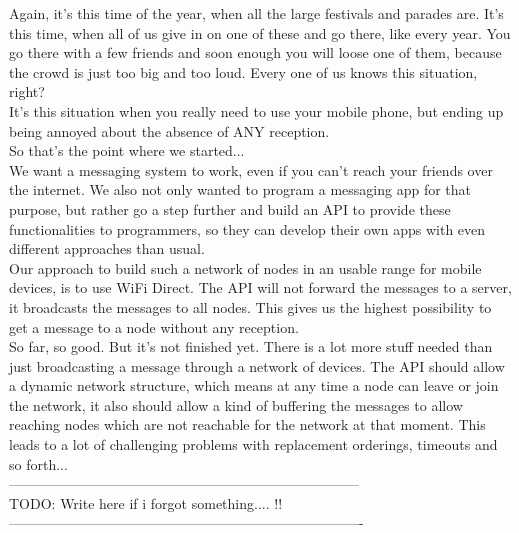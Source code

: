 Again, it's this time of the year, when all the large festivals and parades are. It's this time, when all of us give in on one of these and go there, like every year. 
You go there with a few friends and soon enough you will loose one of them, because the crowd is just too big and too loud. Every one of us knows this situation, right? \\
It's this situation when you really need to use your mobile phone, but ending up being annoyed about the absence of ANY reception. \\
So that's the point where we started... \\

We want a messaging system to work, even if you can't reach your friends over the internet. We also not only wanted to program a messaging app for that purpose, but rather go a step further and build an API to provide these functionalities to programmers, so they can develop their own apps with even diﬀerent approaches than usual. \\

Our approach to build such a network of nodes in an usable range for mobile devices, is to use WiFi Direct. The API will not forward the messages to a server, it broadcasts the messages to all nodes. This gives us the highest possibility to get a message to a node without any reception. \\

So far, so good. But it's not finished yet. There is a lot more stuff needed than just broadcasting a message through a network of devices. The API should allow a dynamic network structure, which means at any time a node can leave or join the network, it also should allow a kind of buffering the messages to allow reaching nodes which are not reachable for the network at that moment. This leads to a lot of challenging problems with replacement orderings, timeouts and so forth... \\

---------------------------------------------------------------------------\\
TODO: Write here if i forgot something.... !! \\

----------------------------------------------------------------------------